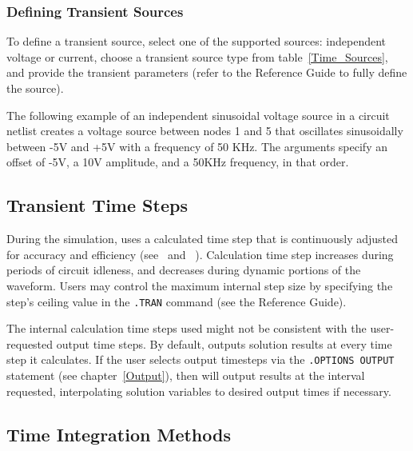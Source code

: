 \subsubsection{Defining Transient Sources}

To define a transient source, select one of the supported sources:
independent voltage or current, choose a transient source type from
table~\ref{Time_Sources}, and provide the transient parameters (refer
to the \Xyce{} Reference Guide\ReferenceGuide{} to fully define the
source).

The following example of an independent sinusoidal voltage source in a
circuit netlist creates a voltage source between nodes 1 and 5
that oscillates sinusoidally between -5V and +5V with a frequency of
50 KHz.  The arguments specify an offset of -5V, a 10V amplitude, and
a 50KHz frequency, in that order.



\subsection{Transient Time Steps}
\label{Time_Steps}
 

During the simulation, \Xyce{} uses a calculated time step that is
continuously adjusted for accuracy and efficiency
(see~\cite{WKHH:2000} and ~\cite{Petzold:1996}).  Calculation time
step increases during periods of circuit idleness, and decreases
during dynamic portions of the waveform.   Users may control the maximum internal step size by specifying
the step's ceiling value in the \verb|.TRAN| command (see the \Xyce{}
Reference Guide\ReferenceGuide{}).

The internal calculation time steps used might not be consistent with
the user-requested  output time steps.  By
default, \Xyce{} outputs solution results at every time step it
calculates.  If the user selects output timesteps via the
\verb|.OPTIONS OUTPUT| statement (see chapter~\ref{Output}), then
\Xyce{} will output results at the interval requested, interpolating
solution variables to desired output times if necessary.


\subsection{Time Integration Methods}
\label{TransientControls}
 

